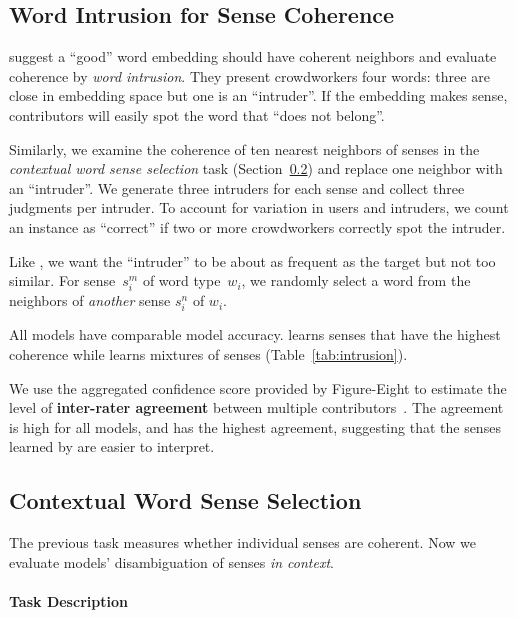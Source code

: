 \subsection{Word Intrusion for Sense Coherence}
\label{sec:word_intrusion}

\citet{schnabel-15} suggest a ``good'' word embedding should have
coherent neighbors and evaluate coherence by \emph{word
  intrusion}.
They present crowdworkers four words: three are close
in embedding space but one is an ``intruder''.
If the
embedding makes sense, contributors will easily spot the word that
``does not belong''.

Similarly, we examine the coherence of ten nearest neighbors of senses
in the \emph{contextual word sense selection} task
(Section~\ref{sec:sense_selection}) and replace one neighbor with an
``intruder''.
We generate three
intruders for each sense and collect three judgments per intruder.
To account for variation in users and intruders, we count an instance
as ``correct'' if two or more crowdworkers correctly spot the
intruder.




Like , we want the ``intruder'' to be about
as frequent as the target but not too similar.
For sense~$s_i^{m}$ of word type~$w_i$, we randomly select
a word from the neighbors of \emph{another} sense $s_i^{n}$ of $w_i$.

All models have comparable model accuracy.  \gasi{-$\beta$} learns
senses that have the highest coherence while  learns
mixtures of senses (Table~\ref{tab:intrusion}).

We use the aggregated confidence score provided by Figure-Eight to
estimate the level of \textbf{inter-rater agreement} between multiple
contributors~\cite{f8-confidence}.
The agreement is high for all models, and \gasi{-$\beta$} has the
highest agreement, suggesting that the senses learned by
\gasi{-$\beta$} are easier to interpret.


\subsection{Contextual Word Sense Selection}
\label{sec:sense_selection}

The previous task measures whether individual senses are
coherent.
Now we evaluate models' disambiguation of senses \emph{in context}.

\paragraph{Task Description} 

